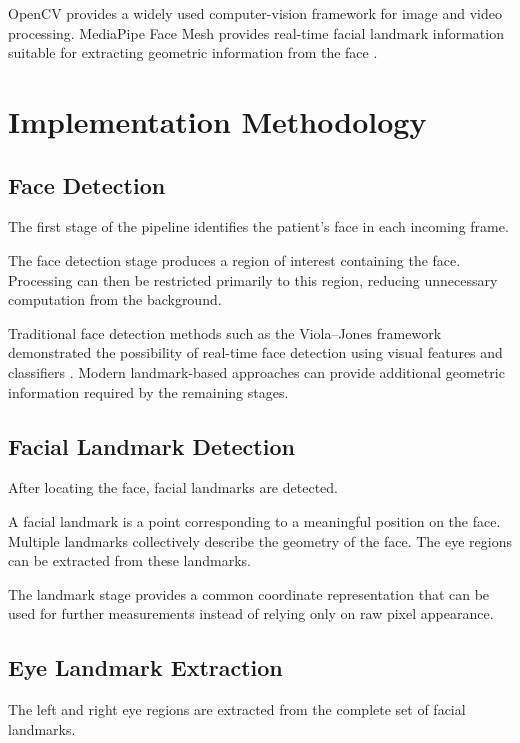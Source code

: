 \documentclass[12pt]{tietreport}
\begin{document}
OpenCV provides a widely used computer-vision framework for image and
video processing. MediaPipe Face Mesh provides real-time facial
landmark information suitable for extracting geometric information
from the face \cite{kartynnik2019facemesh,opencv,mediapipe}.

\section{Implementation Methodology}

\subsection{Face Detection}

The first stage of the pipeline identifies the patient's face in
each incoming frame.

The face detection stage produces a region of interest containing
the face. Processing can then be restricted primarily to this region,
reducing unnecessary computation from the background.

Traditional face detection methods such as the Viola--Jones
framework demonstrated the possibility of real-time face detection
using visual features and classifiers \cite{viola2004rapid}.
Modern landmark-based approaches can provide additional geometric
information required by the remaining stages.

\subsection{Facial Landmark Detection}

After locating the face, facial landmarks are detected.

A facial landmark is a point corresponding to a meaningful position
on the face. Multiple landmarks collectively describe the geometry of
the face. The eye regions can be extracted from these landmarks.

The landmark stage provides a common coordinate representation that
can be used for further measurements instead of relying only on raw
pixel appearance.

\subsection{Eye Landmark Extraction}

The left and right eye regions are extracted from the complete set of
facial landmarks.
\end{document}
